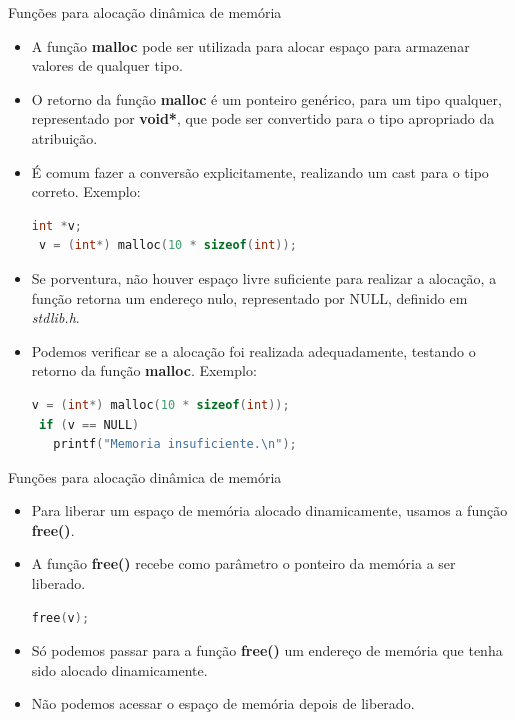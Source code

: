 \begin{frame}{Funções para alocação dinâmica de memória}  
  \begin{itemize}[<+->]
  \item A função \textbf{malloc} pode ser utilizada para alocar espaço para armazenar valores de qualquer tipo.
  \item O retorno da função \textbf{malloc} é um ponteiro genérico, para um tipo qualquer, representado por \textbf{void*}, que pode ser convertido para o tipo apropriado da atribuição.
  \item É comum fazer a conversão explicitamente, realizando um \alert{cast} para o tipo correto. Exemplo: 
\begin{lstlisting}[language=C]
 int *v;
 v = (int*) malloc(10 * sizeof(int));
\end{lstlisting}
    \item Se porventura, não houver espaço livre suficiente para realizar a alocação, a função retorna um endereço nulo, representado por \alert{NULL}, definido em \textit{stdlib.h}.
    \item Podemos verificar se a alocação foi realizada adequadamente, testando o retorno da função \textbf{malloc}. Exemplo:
\begin{lstlisting}[language=C]
 v = (int*) malloc(10 * sizeof(int));
 if (v == NULL) 
   printf("Memoria insuficiente.\n");
\end{lstlisting}
\end{itemize}
\end{frame}

\begin{frame}[fragile,c]{Funções para alocação dinâmica de memória}
  \begin{itemize}[<+->]
    \item Para liberar um espaço de memória alocado dinamicamente, usamos a função \textbf{free()}.
    \item A função \textbf{free()} recebe como parâmetro o ponteiro da memória a ser liberado.
\begin{lstlisting}[language=C]
free(v);
\end{lstlisting}
    \item Só podemos passar para a função \textbf{free()} um endereço de memória que tenha sido alocado dinamicamente.
    \item Não podemos acessar o espaço de memória depois de liberado.
  \end{itemize}  
\end{frame}

